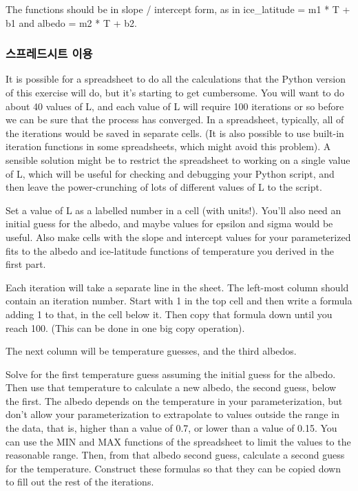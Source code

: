 {The functions should be in slope / intercept form, as in ice_latitude = m1 * T + b1 and albedo = m2 * T + b2.

\subsubsection{스프레드시트 이용}\index{}
It is possible for a spreadsheet to do all the calculations that the Python version of this exercise will do, but it's starting to get cumbersome. You will want to do about 40 values of L, and each value of L will require 100 iterations or so before we can be sure that the process has converged. In a spreadsheet, typically, all of the iterations would be saved in separate cells. (It is also possible to use built-in iteration functions in some spreadsheets, which might avoid this problem). A sensible solution might be to restrict the spreadsheet to working on a single value of L, which will be useful for checking and debugging your Python script, and then leave the power-crunching of lots of different values of L to the script.

Set a value of L as a labelled number in a cell (with units!). You'll also need an initial guess for the albedo, and maybe values for epsilon and sigma would be useful. Also make cells with the slope and intercept values for your parameterized fits to the albedo and ice-latitude functions of temperature you derived in the first part.

Each iteration will take a separate line in the sheet. The left-most column should contain an iteration number. Start with 1 in the top cell and then write a formula adding 1 to that, in the cell below it. Then copy that formula down until you reach 100. (This can be done in one big copy operation).

The next column will be temperature guesses, and the third albedos.

Solve for the first temperature guess assuming the initial guess for the albedo. Then use that temperature to calculate a new albedo, the second guess, below the first. The albedo depends on the temperature in your parameterization, but don’t allow your parameterization to extrapolate to values outside the range in the data, that is, higher than a value of 0.7, or lower than a value of 0.15. You can use the MIN and MAX functions of the spreadsheet to limit the values to the reasonable range. Then, from that albedo second guess, calculate a second guess for the temperature. Construct these formulas so that they can be copied down to fill out the rest of the iterations.

}
